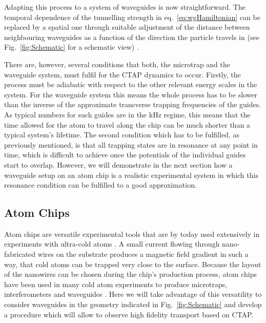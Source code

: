 Adapting this process to a system of waveguides is now straightforward. The temporal dependence of the tunnelling strength in eq.~\eqref{eq:wgHamiltonian} can be replaced by a spatial one through suitable adjustment of the distance between neighbouring waveguides as a function of the direction the particle travels in (see Fig.~\ref{fig:Schematic} for a schematic view) \cite{Eckert:06}.

There are, however, several conditions that both, the microtrap and the waveguide system, must fulfil for the CTAP dynamics to occur. Firstly, the process must be adiabatic with respect to the other relevant energy scales in the system. For the waveguide system this means the whole process has to be slower than the inverse of the approximate transverse trapping frequencies of the guides. As typical numbers for such guides are in the kHz regime, this means that the time allowed for the atom to travel along the chip  can be much shorter than a typical system's lifetime. The second condition which has to be fulfilled, as previously mentioned, is that all trapping states are in resonance at any point in time, which is difficult to achieve once the potentials of the individual guides start to overlap. However, we will demonstrate in the next section how a waveguide setup on an atom chip is a realistic experimental system in which this resonance condition can be fulfilled to a good approximation.

\subsection{Atom Chips}
\label{sec:Atom Chips}

Atom chips are versatile experimental tools that are by today used extensively in experiments with ultra-cold atoms \cite{Folman:00,Fortagh:07}. A small current flowing through nano-fabricated wires on the substrate produces a magnetic field gradient in such a way, that cold atoms can be trapped very close to the surface. Because the layout of the nanowires can be chosen during the chip's production process, atom chips have been used in many cold atom experiments to produce microtraps, interferometers and waveguides \cite{Fortagh:07,Schwindt:05,Schumm:05,Petrovic:11}. Here we will take advantage of this versatility to consider waveguides in the geometry indicated in Fig.~\ref{fig:Schematic} and develop a procedure which will allow to observe high fidelity transport based on CTAP.

